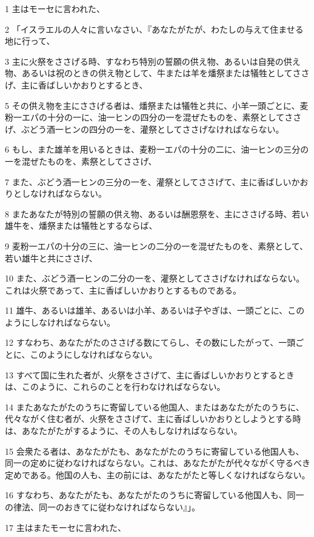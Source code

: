 \par 1 主はモーセに言われた、
\par 2 「イスラエルの人々に言いなさい、『あなたがたが、わたしの与えて住ませる地に行って、
\par 3 主に火祭をささげる時、すなわち特別の誓願の供え物、あるいは自発の供え物、あるいは祝のときの供え物として、牛または羊を燔祭または犠牲としてささげ、主に香ばしいかおりとするとき、
\par 5 その供え物を主にささげる者は、燔祭または犠牲と共に、小羊一頭ごとに、麦粉一エパの十分の一に、油一ヒンの四分の一を混ぜたものを、素祭としてささげ、ぶどう酒一ヒンの四分の一を、灌祭としてささげなければならない。
\par 6 もし、また雄羊を用いるときは、麦粉一エパの十分の二に、油一ヒンの三分の一を混ぜたものを、素祭としてささげ、
\par 7 また、ぶどう酒一ヒンの三分の一を、灌祭としてささげて、主に香ばしいかおりとしなければならない。
\par 8 またあなたが特別の誓願の供え物、あるいは酬恩祭を、主にささげる時、若い雄牛を、燔祭または犠牲とするならば、
\par 9 麦粉一エパの十分の三に、油一ヒンの二分の一を混ぜたものを、素祭として、若い雄牛と共にささげ、
\par 10 また、ぶどう酒一ヒンの二分の一を、灌祭としてささげなければならない。これは火祭であって、主に香ばしいかおりとするものである。
\par 11 雄牛、あるいは雄羊、あるいは小羊、あるいは子やぎは、一頭ごとに、このようにしなければならない。
\par 12 すなわち、あなたがたのささげる数にてらし、その数にしたがって、一頭ごとに、このようにしなければならない。
\par 13 すべて国に生れた者が、火祭をささげて、主に香ばしいかおりとするときは、このように、これらのことを行わなければならない。
\par 14 またあなたがたのうちに寄留している他国人、またはあなたがたのうちに、代々ながく住む者が、火祭をささげて、主に香ばしいかおりとしようとする時は、あなたがたがするように、その人もしなければならない。
\par 15 会衆たる者は、あなたがたも、あなたがたのうちに寄留している他国人も、同一の定めに従わなければならない。これは、あなたがたが代々ながく守るべき定めである。他国の人も、主の前には、あなたがたと等しくなければならない。
\par 16 すなわち、あなたがたも、あなたがたのうちに寄留している他国人も、同一の律法、同一のおきてに従わなければならない』」。
\par 17 主はまたモーセに言われた、
